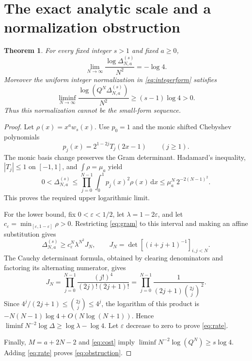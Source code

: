 \documentclass[11pt]{article}
\newtheorem{theorem}{Theorem}
\newcommand{\dd}{\,\mathrm{d}}
\begin{document}
\section{The exact analytic scale and a normalization obstruction}
\begin{theorem}
For every fixed integer $s>1$ and fixed $a\ge0$,
\begin{equation}
 \lim_{N\to\infty}\frac{\log\Delta_{N,a}^{(s)}}{N^2}=-\log4 .
 \label{eq:rate}
\end{equation}
Moreover the uniform integer normalization in \eqref{eq:integerform} satisfies
\begin{equation}
 \liminf_{N\to\infty}
 \frac{\log(Q^N\Delta_{N,a}^{(s)})}{N^2}
 \ge(s-1)\log4>0.
 \label{eq:obstruction}
\end{equation}
Thus this normalization cannot be the small-form sequence.
\end{theorem}
\begin{proof}
Let $\rho(x)=x^a w_s(x)$. Use $p_0=1$ and the monic shifted Chebyshev polynomials
\[
 p_j(x)=2^{1-2j}T_j(2x-1)\qquad(j\ge1).
\]
The monic basis change preserves the Gram determinant. Hadamard's inequality,
$|T_j|\le1$ on $[-1,1]$, and $\int\rho=\mu_a$ yield
\begin{equation}
 0<\Delta_{N,a}^{(s)}
 \le\prod_{j=0}^{N-1}\int_0^1p_j(x)^2\rho(x)\dd x
 \le\mu_a^N\,2^{-2(N-1)^2}.
 \label{eq:upper}
\end{equation}
This proves the required upper logarithmic limit.

For the lower bound, fix $0<\varepsilon<1/2$, let
$\lambda=1-2\varepsilon$, and let
$c_\varepsilon=\min_{[\varepsilon,1-\varepsilon]}\rho>0$.
Restricting \eqref{eq:gram} to this interval and making an affine substitution
gives
\begin{equation}
 \Delta_{N,a}^{(s)}
 \ge c_\varepsilon^N\lambda^{N^2} J_N,\qquad
 J_N=\det[(i+j+1)^{-1}]_{i,j<N}.
 \label{eq:lower}
\end{equation}
The Cauchy determinant formula, obtained by clearing denominators and
factoring its alternating numerator, gives
\[
 J_N=\prod_{j=0}^{N-1}
 \frac{(j!)^4}{(2j)!(2j+1)!}
 =\prod_{j=0}^{N-1}
 \frac1{(2j+1)\binom{2j}{j}^{\,2}} .
\]
Since $4^j/(2j+1)\le\binom{2j}{j}\le4^j$, the logarithm of this product is
$-N(N-1)\log4+O(N\log(N+1))$. Hence
$\liminf N^{-2}\log\Delta\ge\log\lambda-\log4$.
Let $\varepsilon$ decrease to zero to prove \eqref{eq:rate}.

Finally, $M=a+2N-2$ and \eqref{eq:cost} imply
$\liminf N^{-2}\log(Q^N)\ge s\log4$.
Adding \eqref{eq:rate} proves \eqref{eq:obstruction}.
\end{proof}
\end{document}
